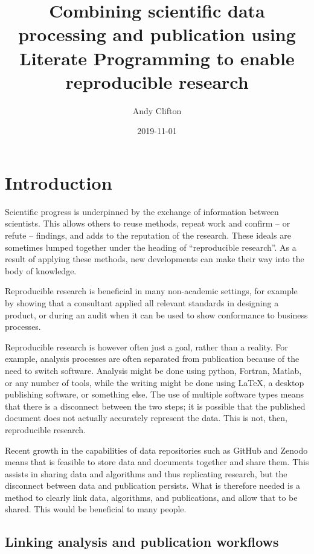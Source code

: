 \documentclass[11pt,]{article}
\title{Combining scientific data processing and publication using Literate Programming to enable reproducible research}
\author{Andy Clifton}
\date{2019-11-01}
\begin{document}
\maketitle

{
\hypersetup{linkcolor=black}
\setcounter{tocdepth}{2}
\tableofcontents
}
\hypertarget{sec:intro}{%
\section{Introduction}\label{sec:intro}}

Scientific progress is underpinned by the exchange of information between scientists. This allows others to reuse methods, repeat work and confirm -- or refute -- findings, and adds to the reputation of the research. These ideals are sometimes lumped together under the heading of ``reproducible research''. As a result of applying these methods, new developments can make their way into the body of knowledge.

Reproducible research is beneficial in many non-academic settings, for example by showing that a consultant applied all relevant standards in designing a product, or during an audit when it can be used to show conformance to business processes.

Reproducible research is however often just a goal, rather than a reality. For example, analysis processes are often separated from publication because of the need to switch software. Analysis might be done using python, Fortran, Matlab, or any number of tools, while the writing might be done using LaTeX, a desktop publishing software, or something else. The use of multiple software types means that there is a disconnect between the two steps; it is possible that the published document does not actually accurately represent the data. This is not, then, reproducible research.

Recent growth in the capabilities of data repositories such as GitHub and Zenodo means that is feasible to store data and documents together and share them. This assists in sharing data and algorithms and thus replicating research, but the disconnect between data and publication persists. What is therefore needed is a method to clearly link data, algorithms, and publications, and allow that to be shared. This would be beneficial to many people.

\hypertarget{linking-analysis-and-publication-workflows}{%
\subsection{Linking analysis and publication workflows}\label{linking-analysis-and-publication-workflows}}
\end{document}
